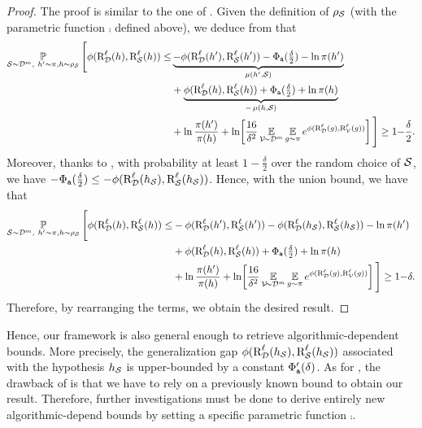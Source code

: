 \documentclass[twoside]{article}
\theoremstyle{plain}
\begin{document}
\begin{proof}
The proof is similar to the one of .
Given the definition of $\rho_{\mathcal{S}}$ (with the parametric function $\comp$ defined above), we deduce from  that 
\begin{align*}
    \operatorname*{\mathbb{P}}_{\mathcal{S}\sim\mathcal{D}^m,\ h'\sim\pi, h\sim\rho_{\mathcal{S}}}\Bigg[ \phi(\text{R}^{\ell}_{\mathcal{D}}(h), \text{R}^{\ell}_{\mathcal{S}}(h)) \le &\underbrace{-\phi(\text{R}^{\ell}_{\mathcal{D}}(h'),\text{R}^{\ell}_{\mathcal{S}}(h'))  -\Phi_{{\tt a}}(\tfrac{\delta}{2}) -\ln\pi(h')}_{\operatorname{\mu}(h', \mathcal{S})}\\
    &+ \underbrace{\phi(\text{R}^{\ell}_{\mathcal{D}}(h),\text{R}^{\ell}_{\mathcal{S}}(h)) + \Phi_{{\tt a}}(\tfrac{\delta}{2}) + \ln\pi(h)}_{-\operatorname{\mu}(h, \mathcal{S})}\\
    &+ \ln\frac{\pi(h')}{\pi(h)} + \ln\!\left[\frac{16}{\delta^2} \operatorname*{\mathbb{E}}_{\mathcal{V}\!{\sim}\mathcal{D}^m}\operatorname*{\mathbb{E}}_{g{\sim}\pi} e^{\phi(\text{R}^{\ell}_{\mathcal{D}}(g),\text{R}^{\ell}_{\mathcal{V}}(g))}\right] \Bigg] \ge 1{-}\frac{\delta}{2}.
\end{align*}
Moreover, thanks to , with probability at least $1{-}\frac{\delta}{2}$ over the random choice of $\mathcal{S}$, we have $-\Phi_{{\tt a}}(\tfrac{\delta}{2}) \le -\phi(\text{R}^{\ell}_{\mathcal{D}}(h_{\mathcal{S}}),\text{R}^{\ell}_{\mathcal{S}}(h_{\mathcal{S}}))$.
Hence, with the union bound, we have that 
\begin{align*}
    \operatorname*{\mathbb{P}}_{\mathcal{S}\sim\mathcal{D}^m,\ h'\sim\pi, h\sim\rho_{\mathcal{S}}}\Bigg[ \phi(\text{R}^{\ell}_{\mathcal{D}}(h), \text{R}^{\ell}_{\mathcal{S}}(h)) \le &-\phi(\text{R}^{\ell}_{\mathcal{D}}(h'),\text{R}^{\ell}_{\mathcal{S}}(h'))  -\phi(\text{R}^{\ell}_{\mathcal{D}}(h_{\mathcal{S}}),\text{R}^{\ell}_{\mathcal{S}}(h_{\mathcal{S}})) -\ln\pi(h')\\
    &+ \phi(\text{R}^{\ell}_{\mathcal{D}}(h),\text{R}^{\ell}_{\mathcal{S}}(h)) + \Phi_{{\tt a}}(\tfrac{\delta}{2}) + \ln\pi(h)\\
    &+ \ln\frac{\pi(h')}{\pi(h)} + \ln\!\left[\frac{16}{\delta^2} \operatorname*{\mathbb{E}}_{\mathcal{V}\!{\sim}\mathcal{D}^m}\operatorname*{\mathbb{E}}_{g{\sim}\pi} e^{\phi(\text{R}^{\ell}_{\mathcal{D}}(g),\text{R}^{\ell}_{\mathcal{V}}(g))}\right] \Bigg] \ge 1{-}\delta.
\end{align*}
Therefore, by rearranging the terms, we obtain the desired result.
\end{proof}

Hence, our framework is also general enough to retrieve algorithmic-dependent bounds.
More precisely, the generalization gap $\phi(\text{R}^{\ell}_{\mathcal{D}}(h_{\mathcal{S}}),\text{R}^{\ell}_{\mathcal{S}}(h_{\mathcal{S}}))$ associated with the hypothesis $h_{\mathcal{S}}$ is upper-bounded by a constant $\Phi_{{\tt a}}'(\delta)$.
As for , the drawback of  is that we have to rely on a previously known bound to obtain our result.
Therefore, further investigations must be done to derive entirely new algorithmic-depend bounds by setting a specific parametric function $\comp$.
\end{document}
